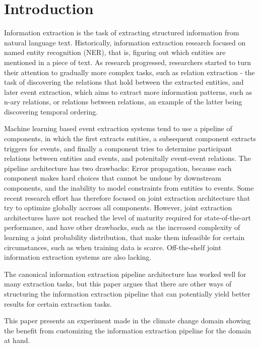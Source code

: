 \section{Introduction}

Information extraction is the task of extracting structured information from natural language text. Historically, information extraction research focused on named entity recognition (NER), that is, figuring out which entities are mentioned in a piece of text. As research progressed, researchers started to turn their attention to gradually more complex tasks, such as relation extraction - the task of discovering the relations that hold between the extracted entities, and later event extraction, which aims to extract more information patterns, such as n-ary relations, or relations between relations, an example of the latter being discovering temporal ordering.

Machine learning based event extraction systems tend to use a pipeline of components, in which the first extracts entities, a subsequent component extracts triggers for events, and finally a component tries to determine participant relations between entities and events, and potenitally event-event relations. The pipeline architecture has two drawbacks: Error propagation, because each component makes hard choices that cannot be undone by downstream components, and the inability to model constraints from entities to events. Some recent research effort has therefore focused on joint extraction architecture that try to optimize globally accross all components. However, joint extraction architectures have not reached the level of maturity required for state-of-the-art performance, and have other drawbacks, such as the increased complexity of learning a joint probability distribution, that make them infeasible for certain circumstances, such as when training data is scarce. Off-the-shelf joint information extraction systems are also lacking.

The canonical information extraction pipeline architecture has worked well for many extraction tasks, but this paper argues that there are other ways of structuring the information extraction pipeline that can potentially yield better results for certain extraction tasks.

This paper presents an experiment made in the climate change domain showing the benefit from customizing the information extraction pipeline for the domain at hand. 

